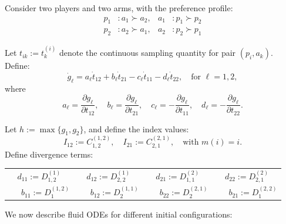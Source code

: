 \documentclass{article}
\begin{document}
Consider two players and two arms, with the preference profile:
\begin{align*}
    p_1 & : a_1 \succ a_2, & a_1 & : p_1 \succ p_2 \\
    p_2 & : a_2 \succ a_1, & a_2 & : p_2 \succ p_1
\end{align*}

Let $t_{ik} := t^{(i)}_k$ denote the continuous sampling quantity for pair $(p_i, a_k)$. Define:
\[
    \dot{g}_\ell = a_\ell \dot{t}_{12} + b_\ell \dot{t}_{21} - c_\ell \dot{t}_{11} - d_\ell \dot{t}_{22}, \quad \text{for } \ell = 1, 2,
\]
where
\[
    a_\ell = \frac{\partial g_\ell}{\partial t_{12}}, \quad
    b_\ell = \frac{\partial g_\ell}{\partial t_{21}}, \quad
    c_\ell = -\frac{\partial g_\ell}{\partial t_{11}}, \quad
    d_\ell = -\frac{\partial g_\ell}{\partial t_{22}}.
\]

Let $h := \max\{g_1, g_2\}$, and define the index values:
\[
    I_{12} := C^{(1,2)}_{1,2}, \quad I_{21} := C^{(2,1)}_{2,1}, \quad \text{with } m(i) = i.
\]
Define divergence terms:
\begin{table}[H]
    \centering
    \begin{tabular}{cccc}
       $d_{11} := D^{(1)}_{1,2}$  & $d_{12} := D^{(1)}_{2,2}$ & $d_{21} := D^{(2)}_{1,1}$ & $d_{22} := D^{(2)}_{2,1}$  \\
       \ \ \ $b_{11} := D^{(1,2)}_{1}$ &\ \ \  $b_{12} := D^{(1,1)}_{2}$  &\ \ \  $b_{22} := D^{(2,1)}_{2} $&\ \ \   $b_{21} := D^{(2,2)}_{1}$
    \end{tabular}
\end{table}


We now describe fluid ODEs for different initial configurations:
\end{document}
